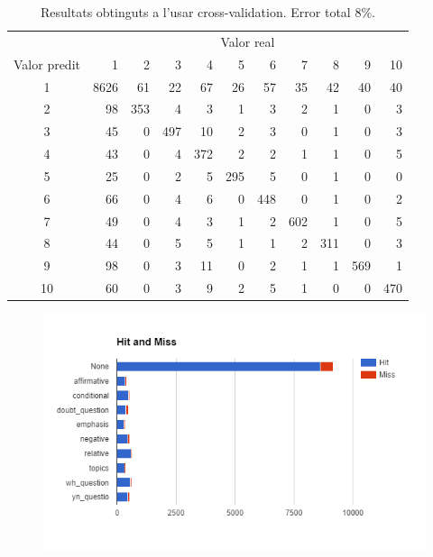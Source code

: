 \documentclass[a4paper]{article}
\begin{document}
\begin{table}[H]
	\centering
	\def\arraystretch{1.2}
	\begin{tabular}{|c|rrrrrrrrrr|}
		\hline
		& \multicolumn{10}{c|}{Valor real} \\
		Valor predit & 1 & 2 & 3 & 4 & 5 & 6 & 7 & 8 & 9 & 10 \\
		 \hline
		1 & 8626 & 61 & 22 & 67 & 26 & 57 & 35 & 42 & 40 & 40 \\
		2 & 98 & 353 & 4 & 3 & 1 & 3 & 2 & 1 & 0 & 3 \\
		3 & 45 & 0 & 497 & 10 & 2 & 3 & 0 & 1 & 0 & 3 \\
		4 & 43 & 0 & 4 & 372 & 2 & 2 & 1 & 1 & 0 & 5 \\
		5 & 25 & 0 & 2 & 5 & 295 & 5 & 0 & 1 & 0 & 0 \\
		6 & 66 & 0 & 4 & 6 & 0 & 448 & 0 & 1 & 0 & 2 \\
		7 & 49 & 0 & 4 & 3 & 1 & 2 & 602 & 1 & 0 & 5 \\
		8 & 44 & 0 & 5 & 5 & 1 & 1 & 2 & 311 & 0 & 3 \\
		9 & 98 & 0 & 3 & 11 & 0 & 2 & 1 & 1 & 569 & 1 \\
		10 & 60 & 0 & 3 & 9 & 2 & 5 & 1 & 0 & 0 & 470 \\
		\hline
	\end{tabular}
	\caption{Resultats obtinguts a l'usar cross-validation. Error total 8\%.}
\end{table}

\begin{figure}[H]
	\centering
	\includegraphics[width=\textwidth]{images/image00}
\end{figure}
\end{document}
